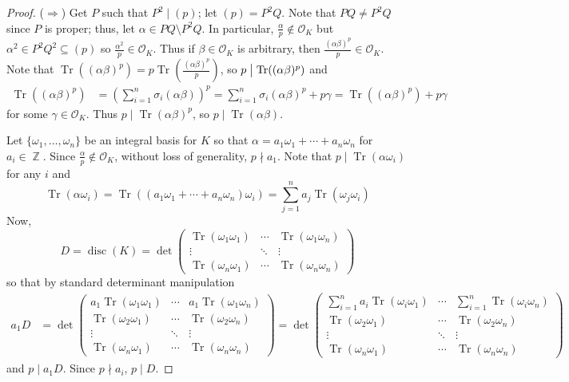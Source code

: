 \documentclass[11pt, a4paper]{memoir}
\DeclareMathOperator{\Z}{{\mathbb{Z}}}
\newcommand{\impr}{{($\Rightarrow$)\hspace{0.2cm}}}
\renewcommand{\div}{\bigm|}
\theoremstyle{change}
\theoremstyle{plain}
\theoremstyle{nonumberplain}
\newtheorem{proof}{Proof}
\DeclareMathOperator{\disc}{disc}
\DeclareMathOperator{\Tr}{Tr}
\numberwithin{equation}{section}
\begin{document}
\begin{proof}
    \impr
    Get $P$ such that $P^2\mid(p)$; let $(p)=P^2Q$.
    Note that $PQ\neq  P^2Q$ since $P$ is proper; thus, let $\alpha\in PQ\setminus P^2Q$.
    In particular, $\frac{\alpha}{p}\notin\mathcal{O}_K$ but $\alpha^2\in P^2Q^2\subseteq (p)$ so $\frac{\alpha^2}{p}\in\mathcal{O}_K$.
    Thus if $\beta\in\mathcal{O}_K$ is arbitrary, then $\frac{(\alpha\beta)^p}{p}\in\mathcal{O}_K$.
    Note that $\Tr((\alpha\beta)^p)=p\Tr\left(\frac{(\alpha\beta)^p}{p}\right)$, so $p\div \Tr((\alpha\beta)^p)$ and
    \begin{align*}
        \Tr\left((\alpha\beta)^p\right) &=\left(\sum_{i=1}^n\sigma_i(\alpha\beta)\right)^p=\sum_{i=1}^n\sigma_i(\alpha\beta)^p+p\gamma= \Tr((\alpha\beta)^p)+p\gamma
    \end{align*}
    for some $\gamma\in\mathcal{O}_K$.
    Thus $p\mid\Tr(\alpha\beta)^p$, so $p\mid\Tr(\alpha\beta)$.

    Let $\{\omega_1,\ldots,\omega_n\}$ be an integral basis for $K$ so that $\alpha=a_1\omega_1+\cdots+a_n\omega_n$ for $a_i\in\Z$.
    Since $\frac{\alpha}{p}\notin\mathcal{O}_K$, without loss of generality, $p\nmid a_1$.
    Note that $p\mid\Tr(\alpha\omega_i)$ for any $i$ and
    \begin{equation*}
        \Tr(\alpha\omega_i)=\Tr((a_1\omega_1+\cdots+a_n\omega_n)\omega_i)=\sum_{j=1}^n a_j\Tr(\omega_j\omega_i)
    \end{equation*}
    Now,
    \begin{equation*}
        D=\disc(K)=\det
        \begin{pmatrix}
            \Tr(\omega_1\omega_1) &\cdots&\Tr(\omega_1\omega_n)\\
            \vdots&\ddots&\vdots\\
            \Tr(\omega_n\omega_1) &\cdots&\Tr(\omega_n\omega_n)
        \end{pmatrix}
    \end{equation*}
    so that by standard determinant manipulation
    \begin{align*}
        a_1D &=\det
        \begin{pmatrix}
            a_1\Tr(\omega_1\omega_1) &\cdots&a_1\Tr(\omega_1\omega_n)\\
            \Tr(\omega_2\omega_1) &\cdots&\Tr(\omega_2\omega_n)\\
            \vdots&\ddots&\vdots\\
            \Tr(\omega_n\omega_1) &\cdots&\Tr(\omega_n\omega_n)
        \end{pmatrix}
        =\det
        \begin{pmatrix}
            \sum_{i=1}^n a_i\Tr(\omega_i\omega_1) &\cdots & \sum_{i=1}^n\Tr(\omega_i\omega_n)\\
            \Tr(\omega_2\omega_1) &\cdots&\Tr(\omega_2\omega_n)\\
            \vdots&\ddots&\vdots\\
            \Tr(\omega_n\omega_1) &\cdots&\Tr(\omega_n\omega_n)
        \end{pmatrix}
    \end{align*}
    and $p\mid a_1D$.
    Since $p\nmid a_i$, $p\mid D$.


\end{proof}
\end{document}
